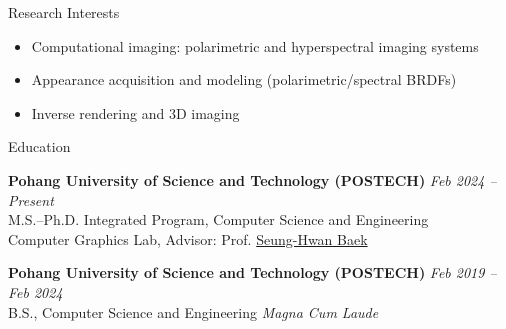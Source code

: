 \documentclass{cv}
\begin{document}
\begin{rSection}{Research Interests}
\begin{itemize}
\item Computational imaging: polarimetric and hyperspectral imaging systems
\item Appearance acquisition and modeling (polarimetric/spectral BRDFs)
\item Inverse rendering and 3D imaging
\end{itemize}
\end{rSection}

\begin{rSection}{Education}

{\bf Pohang University of Science and Technology (POSTECH)} \hfill {\em Feb 2024 -- Present}\\
M.S.--Ph.D. Integrated Program, Computer Science and Engineering\\
Computer Graphics Lab, Advisor: Prof. \href{https://www.shbaek.com}{Seung-Hwan Baek}

{\bf Pohang University of Science and Technology (POSTECH)} \hfill {\em Feb 2019 -- Feb 2024}\\
B.S., Computer Science and Engineering \hfill {\em Magna Cum Laude}

\end{rSection}
\end{document}
